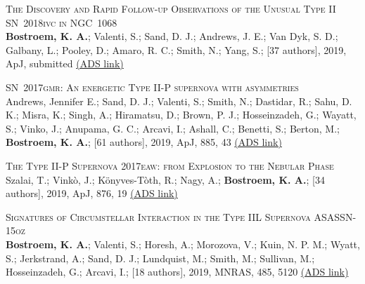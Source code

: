 
\vspace{-0.1in}  
\begin{revnumerate}[14]
\item{\textsc{The Discovery and Rapid Follow-up Observations of the Unusual Type II SN~2018ivc in NGC~1068}\\
{\bf Bostroem, K. A.}; Valenti, S.; Sand, D. J.; Andrews, J. E.; Van Dyk, S. D.; Galbany, L.; Pooley, D.; Amaro, R. C.; Smith, N.; Yang, S.; [37 authors], 2019, ApJ, submitted 
\color{blue}\href{https://ui.adsabs.harvard.edu/abs/2019arXiv190907304B/abstract}{(ADS link)}\color{black}}\\

\item{\textsc{SN~2017gmr: An energetic Type II-P supernova with asymmetries}\\
Andrews, Jennifer E.; Sand, D. J.; Valenti, S.; Smith, N.; Dastidar, R.; Sahu, D. K.; Misra, K.; Singh, A.; Hiramatsu, D.; Brown, P. J.; Hosseinzadeh, G.; Wayatt, S.; Vinko, J.; Anupama, G. C.; Arcavi, I.; Ashall, C.; Benetti, S.; Berton, M.; \textbf{Bostroem, K. A.}; [61 authors], 2019, ApJ, 885, 43
\color{blue}\href{https://ui.adsabs.harvard.edu/abs/2019arXiv190701013A/abstract} {(ADS link)}\color{black}}\\

\item{\textsc{The Type II-P Supernova 2017eaw: from Explosion to the Nebular Phase}\\ 
Szalai, T.; Vink\`{o}, J.; K\"{o}nyves-T\`{o}th, R.; Nagy, A.; {\bf Bostroem, K. A.}; [34 authors], 2019, ApJ, 876, 19
\color{blue}\href{https://ui.adsabs.harvard.edu/abs/2019ApJ...876...19S/abstract}{(ADS link)}\color{black}}\\

\item{\textsc{Signatures of Circumstellar Interaction in the Type IIL Supernova ASASSN-15oz}\\ 
{\bf Bostroem, K. A.}; Valenti, S.; Horesh, A.; Morozova, V.; Kuin, N. P. M.; Wyatt, S.; Jerkstrand, A.; Sand, D. J.; Lundquist, M.; Smith, M.; Sullivan, M.; Hosseinzadeh, G.; Arcavi, I.;  [18 authors], 2019, MNRAS, 485, 5120
\color{blue}\href{https://ui.adsabs.harvard.edu/abs/2019MNRAS.485.5120B/abstract}{(ADS link)}\color{black}}\\


\end{revnumerate}
